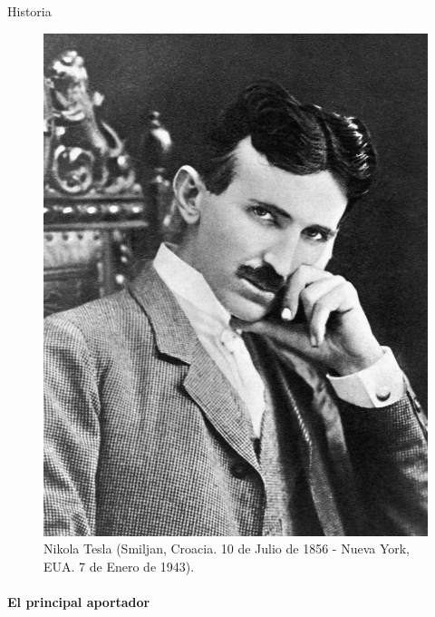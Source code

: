 \documentclass{beamer}
\begin{document}
\begin{darkframes}
\begin{frame}{Historia}
\begin{multicols}{2}
     \newpage
     \begin{figure}
         \centering
         \includegraphics[width = 0.7 \linewidth]{resources/2f.jpg}
         \caption{Nikola Tesla (Smiljan, Croacia. 10 de Julio de 1856 - Nueva York, EUA. 7 de Enero de 1943).}
         \label{fig:my_label}
     \end{figure}
     
      
    \end{multicols}
    \end{frame}


    \begin{frame} %
      \framesubtitle{El principal aportador} %
        

\end{frame}
\end{darkframes}
\end{document}
